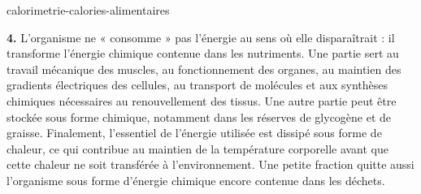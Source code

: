\begin{exo}{calorimetrie-calories-alimentaires}
\begin{solution}
\textbf{4.} L'organisme ne « consomme » pas l'énergie au sens où elle disparaîtrait : il transforme l'énergie chimique contenue dans les nutriments. Une partie sert au travail mécanique des muscles, au fonctionnement des organes, au maintien des gradients électriques des cellules, au transport de molécules et aux synthèses chimiques nécessaires au renouvellement des tissus. Une autre partie peut être stockée sous forme chimique, notamment dans les réserves de glycogène et de graisse. Finalement, l'essentiel de l'énergie utilisée est dissipé sous forme de chaleur, ce qui contribue au maintien de la température corporelle avant que cette chaleur ne soit transférée à l'environnement. Une petite fraction quitte aussi l'organisme sous forme d'énergie chimique encore contenue dans les déchets.

\end{solution}

\end{exo}
